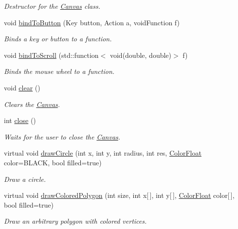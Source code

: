 \begin{DoxyCompactItemize}
\begin{DoxyCompactList}\small\item\em Destructor for the \hyperlink{class_canvas}{Canvas} class. \end{DoxyCompactList}\item 
void \hyperlink{class_canvas_a15f16cb84c520e6c4135bfb52434cfae}{bind\+To\+Button} (Key button, Action a, void\+Function f)
\begin{DoxyCompactList}\small\item\em Binds a key or button to a function. \end{DoxyCompactList}\item 
void \hyperlink{class_canvas_a2125433e0574691a9472783694a32bb6}{bind\+To\+Scroll} (std\+::function$<$ void(double, double)$>$ f)
\begin{DoxyCompactList}\small\item\em Binds the mouse wheel to a function. \end{DoxyCompactList}\item 
void \hyperlink{class_canvas_ac4559a6535f497f17415032632aa9f6a}{clear} ()
\begin{DoxyCompactList}\small\item\em Clears the \hyperlink{class_canvas}{Canvas}. \end{DoxyCompactList}\item 
int \hyperlink{class_canvas_aacaad7796cc3519c6cdde08d916bf841}{close} ()
\begin{DoxyCompactList}\small\item\em Waits for the user to close the \hyperlink{class_canvas}{Canvas}. \end{DoxyCompactList}\item 
virtual void \hyperlink{class_canvas_a890f8e6fb35e2dc24cf0892df4981747}{draw\+Circle} (int x, int y, int radius, int res, \hyperlink{struct_color_float}{Color\+Float} color=B\+L\+A\+C\+K, bool filled=true)
\begin{DoxyCompactList}\small\item\em Draw a circle. \end{DoxyCompactList}\item 
virtual void \hyperlink{class_canvas_a867b3202a838e083e5c7bf703d4a3afc}{draw\+Colored\+Polygon} (int size, int x\mbox{[}$\,$\mbox{]}, int y\mbox{[}$\,$\mbox{]}, \hyperlink{struct_color_float}{Color\+Float} color\mbox{[}$\,$\mbox{]}, bool filled=true)
\begin{DoxyCompactList}\small\item\em Draw an arbitrary polygon with colored vertices. \end{DoxyCompactList}\item 

\end{DoxyCompactItemize}
